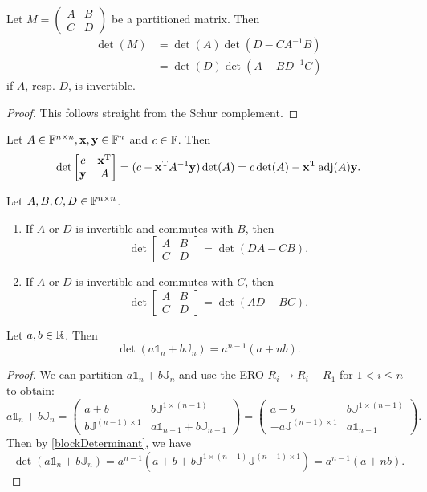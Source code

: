 \begin{lemma} \label{blockDeterminant}
Let $M = \begin{pmatrix}
A & B \\ C & D
\end{pmatrix}$ be a partitioned matrix. Then
\begin{align*}
\det(M) &= \det(A)\det(D-CA^{-1}B) \\
&= \det(D)\det(A-BD^{-1}C)
\end{align*}
if $A$, resp. $D$, is invertible.
\end{lemma}
\begin{proof}
This follows straight from the Schur complement.
\end{proof}
\begin{corollary}
Let $A\in\mathbb{F}^{n\times n}, \boldsymbol{\mathrm{x}},\boldsymbol{\mathrm{y}}\in\mathbb{F}^n$ and $c\in \mathbb{F}$. Then
\[ \det \begin{bmatrix}
c & \boldsymbol{\mathrm{x}}^{\mathrm{T}} \\ \boldsymbol{\mathrm{y}} & A
\end{bmatrix} = (c-\boldsymbol{\mathrm{x}}^{\mathrm{T}} A^{-1}\boldsymbol{\mathrm{y}})\det(A) = c\det(A) - \boldsymbol{\mathrm{x}}^{\mathrm{T}} \operatorname{adj}(A) \boldsymbol{\mathrm{y}}. \]
\end{corollary}
\begin{corollary}
Let $A,B,C,D\in\mathbb{F}^{n\times n}$.
\begin{enumerate}
\item If $A$ or $D$ is invertible and commutes with $B$, then
\[ \det\begin{bmatrix}
A & B \\ C & D
\end{bmatrix} = \det(DA-CB). \]
\item If $A$ or $D$ is invertible and commutes with $C$, then
\[ \det\begin{bmatrix}
A & B \\ C & D
\end{bmatrix} = \det(AD-BC). \]
\end{enumerate}
\end{corollary}

\begin{lemma}
Let $a,b\in\mathbb{R}$. Then
\[ \det(a\mathbb{1}_n+b\mathbb{J}_n) = a^{n-1}(a+nb). \]
\end{lemma}
\begin{proof}
We can partition $a\mathbb{1}_n+b\mathbb{J}_n$ and use the ERO $R_i\to R_i-R_1$ for $1<i\leq n$ to obtain:
\[ a\mathbb{1}_n+b\mathbb{J}_n = \begin{pmatrix}
a+b & b\mathbb{J}^{1\times (n-1)} \\
b\mathbb{J}^{(n-1)\times 1} & a\mathbb{1}_{n-1}+b\mathbb{J}_{n-1}
\end{pmatrix} = \begin{pmatrix}
a+b & b\mathbb{J}^{1\times (n-1)} \\
-a\mathbb{J}^{(n-1)\times 1} & a\mathbb{1}_{n-1}
\end{pmatrix}. \]
Then by \ref{blockDeterminant}, we have
\[ \det(a\mathbb{1}_n+b\mathbb{J}_n) = a^{n-1}(a+b +b\mathbb{J}^{1\times (n-1)}\mathbb{J}^{(n-1)\times 1}) = a^{n-1}(a+nb). \]
\end{proof}

